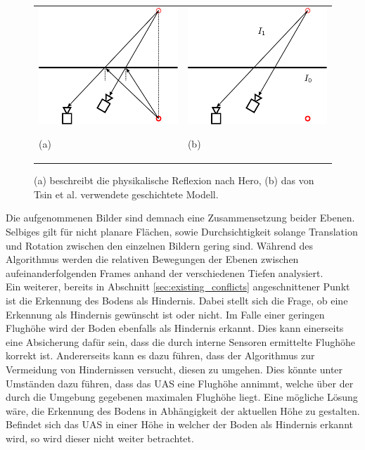 \begin{figure}[h]
  	\centering
	\begin{tabular}{m{6.5cm} m{6.5cm}}
	\includegraphics[width=6.5cm]{img/reflection_model_hero.pdf}
	\begin{center} \small (a) \end{center}
	&
	\includegraphics[width=6.5cm]{img/reflection_model_layers.pdf}
	\begin{center} \small (b) \end{center}
	\end{tabular}
\caption{(a) beschreibt die physikalische Reflexion nach Hero, (b) das von Tsin et al. verwendete geschichtete Modell.}
\label{fig:reflection_models}
\end{figure}

\noindent
Die aufgenommenen Bilder sind demnach eine Zusammensetzung beider Ebenen. Selbiges gilt für nicht planare Flächen, sowie Durchsichtigkeit solange Translation und Rotation zwischen den einzelnen Bildern gering sind. Während des Algorithmus werden die relativen Bewegungen der Ebenen zwischen aufeinanderfolgenden Frames anhand der verschiedenen Tiefen analysiert.\\

\noindent
Ein weiterer, bereits in Abschnitt \ref{sec:existing_conflicts} angeschnittener Punkt ist die Erkennung des Bodens als Hindernis. Dabei stellt sich die Frage, ob eine Erkennung als Hindernis gewünscht ist oder nicht. Im Falle einer geringen Flughöhe wird der Boden ebenfalls als Hindernis erkannt. Dies kann einerseits eine Absicherung dafür sein, dass die durch interne Sensoren ermittelte Flughöhe korrekt ist. Andererseits kann es dazu führen, dass der Algorithmus zur Vermeidung von Hindernissen versucht, diesen zu  umgehen. Dies könnte unter Umständen dazu führen, dass das UAS eine Flughöhe annimmt, welche über der durch die Umgebung gegebenen maximalen Flughöhe liegt. Eine mögliche Lösung wäre, die Erkennung des Bodens in Abhängigkeit der aktuellen Höhe zu gestalten. Befindet sich das UAS in einer Höhe in welcher der Boden als Hindernis erkannt wird, so wird dieser nicht weiter betrachtet. 

